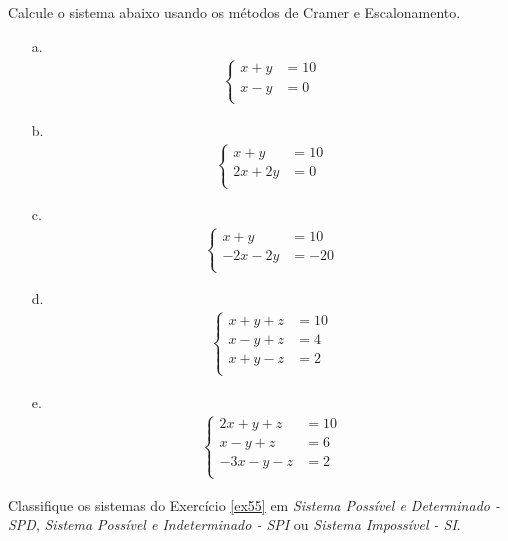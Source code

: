 \begin{exercise}
	\label{ex55}
	Calcule o sistema abaixo usando os métodos de Cramer e Escalonamento.
	\begin{itemize}
		\item[a.]{
			\begin{align*}
				\left \{
				\begin{matrix}
				x+y &=10 \\
				x-y &=0\\
				\end{matrix}
				\right .
			\end{align*}
			}
		\item[b.]{
			\begin{align*}
				\left \{
				\begin{matrix}
				x+y &=10 \\
				2x+2y &=0\\
				\end{matrix}
				\right .
			\end{align*}
			}
		\item[c.]{
			\begin{align*}
				\left \{
				\begin{matrix}
				x+y &=10 \\
				-2x-2y &=-20\\
				\end{matrix}
				\right .
			\end{align*}
			}
		\item[d.]{
			\begin{align*}
			\left \{ \begin{matrix}
			x+y+z &= 10 \\
			x-y+z &= 4 \\
			x+y-z&=2\\
			\end{matrix}
			\right .
			\end{align*}		
			}
		\item[e.]{
			\begin{align*}
			\left \{ \begin{matrix}
			2x+y+z &= 10 \\
			x-y+z &= 6 \\
			-3x-y-z&=2\\
			\end{matrix}
			\right .
			\end{align*}
			}
	\end{itemize}
\end{exercise}

\begin{exercise}
	Classifique os sistemas do Exercício \ref{ex55} em \textit{Sistema Possível e Determinado - SPD}, \textit{Sistema Possível e Indeterminado - SPI} ou \textit{Sistema Impossível - SI}.
\end{exercise}